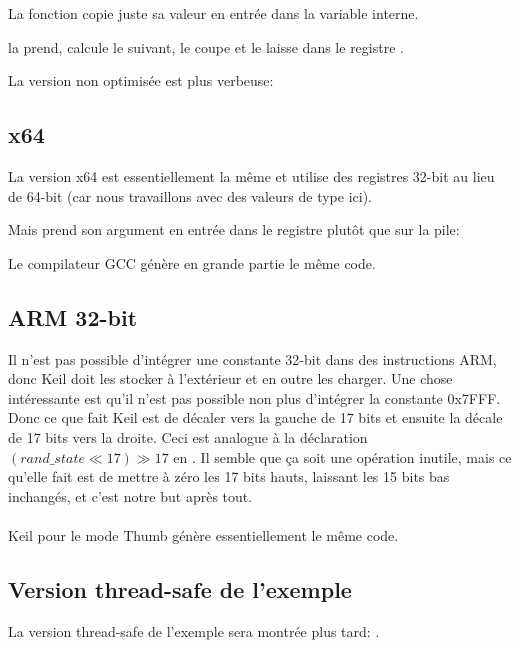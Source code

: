 La fonction  copie juste sa valeur en entrée dans la variable 
interne.

 la prend, calcule le  suivant, le coupe et le laisse
dans le registre \EAX.

La version non optimisée est plus verbeuse:



\subsection{x64}

La version x64 est essentiellement la même et utilise des registres 32-bit au lieu
de 64-bit (car nous travaillons avec des valeurs de type \Tint ici).

Mais  prend son argument en entrée dans le registre \ECX plutôt que
sur la pile:



Le compilateur GCC génère en grande partie le même code.

\subsection{ARM 32-bit}



Il n'est pas possible d'intégrer une constante 32-bit dans des instructions ARM,
donc Keil doit les stocker à l'extérieur et en outre les charger.
Une chose intéressante est qu'il n'est pas possible non plus d'intégrer la constante
0x7FFF.
Donc ce que fait Keil est de décaler  vers la gauche de 17 bits et
ensuite la décale de 17 bits vers la droite.
Ceci est analogue à la déclaration $(rand\_state \ll 17) \gg 17$ en \CCpp.
Il semble que ça soit une opération inutile, mais ce qu'elle fait est de mettre à
zéro les 17 bits hauts, laissant les 15 bits bas inchangés, et c'est notre but après
tout.\\
\\
Keil \Optimizing pour le mode Thumb génère essentiellement le même code.



\subsection{Version thread-safe de l'exemple}

La version thread-safe de l'exemple sera montrée plus tard: .
